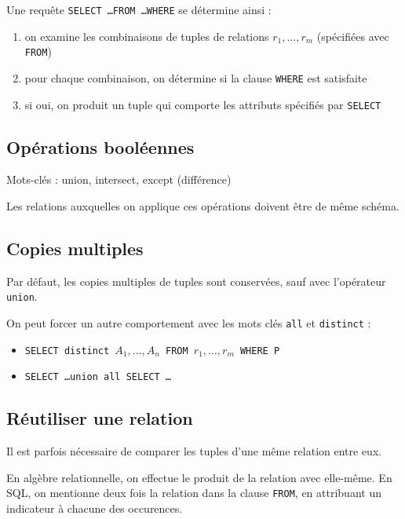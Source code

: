 	 Une requête \texttt{SELECT \dots FROM \dots WHERE} se détermine ainsi :
	 
	 \begin{enumerate}
	 	\item on examine les combinaisons de tuples de relations $r_1, \dots , r_m$ (spécifiées avec \texttt{FROM})
	 	\item pour chaque combinaison, on détermine si la clause \texttt{WHERE} est satisfaite
	 	\item si oui, on produit un tuple qui comporte les attributs spécifiés par \texttt{SELECT}
	 \end{enumerate}
	 
	 	\subsection{Opérations booléennes}
	 	
	 	Mots-clés : union, intersect, except (différence)
	 	
	 	Les relations auxquelles on applique ces opérations doivent être de même schéma.
	 	
	 	\subsection{Copies multiples}
	 	
	 	Par défaut, les copies multiples de tuples sont conservées, sauf avec l'opérateur \texttt{union}.
	 	
	 	On peut forcer un autre comportement avec les mots clés \texttt{all} et \texttt{distinct} :
	 	
	 	\begin{itemize}
	 		\item \texttt{SELECT distinct $A_1, \dots , A_n$ FROM $r_1, \dots , r_m$ WHERE P}
	 		\item \texttt{SELECT \dots union all SELECT \dots}
	 	\end{itemize}
	 	
	 	\subsection{Réutiliser une relation}
	 	
	 	Il est parfois nécessaire de comparer les tuples d'une même relation entre eux.
	 	
	 	En algèbre relationnelle, on effectue le produit de la relation avec elle-même. En SQL, on mentionne deux fois la relation dans la clause \texttt{FROM}, en attribuant un indicateur à chacune des occurences.
	 	
